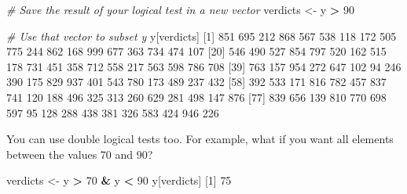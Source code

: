 \documentclass[]{book}
\newenvironment{Shaded}{\begin{snugshade}}{\end{snugshade}}
\newcommand{\CommentTok}[1]{\textcolor[rgb]{0.56,0.35,0.01}{\textit{#1}}}
\newcommand{\DecValTok}[1]{\textcolor[rgb]{0.00,0.00,0.81}{#1}}
\newcommand{\NormalTok}[1]{#1}
\newcommand{\OperatorTok}[1]{\textcolor[rgb]{0.81,0.36,0.00}{\textbf{#1}}}
\newcommand{\StringTok}[1]{\textcolor[rgb]{0.31,0.60,0.02}{#1}}
\begin{document}
\begin{Shaded}
\begin{Highlighting}[]
\CommentTok{# Save the result of your logical test in a new vector}
\NormalTok{verdicts <-}\StringTok{ }\NormalTok{y }\OperatorTok{>}\StringTok{ }\DecValTok{90}

\CommentTok{# Use that vector to subset y}
\NormalTok{y[verdicts]}
\NormalTok{ [}\DecValTok{1}\NormalTok{] }\DecValTok{851} \DecValTok{695} \DecValTok{212} \DecValTok{868} \DecValTok{567} \DecValTok{538} \DecValTok{118} \DecValTok{172} \DecValTok{505} \DecValTok{775} \DecValTok{244} \DecValTok{862} \DecValTok{168} \DecValTok{999} \DecValTok{677} \DecValTok{363} \DecValTok{734} \DecValTok{474} \DecValTok{107}
\NormalTok{[}\DecValTok{20}\NormalTok{] }\DecValTok{546} \DecValTok{490} \DecValTok{527} \DecValTok{854} \DecValTok{797} \DecValTok{520} \DecValTok{162} \DecValTok{515} \DecValTok{178} \DecValTok{731} \DecValTok{451} \DecValTok{358} \DecValTok{712} \DecValTok{558} \DecValTok{217} \DecValTok{563} \DecValTok{598} \DecValTok{786} \DecValTok{708}
\NormalTok{[}\DecValTok{39}\NormalTok{] }\DecValTok{763} \DecValTok{157} \DecValTok{954} \DecValTok{272} \DecValTok{647} \DecValTok{102}  \DecValTok{94} \DecValTok{246} \DecValTok{390} \DecValTok{175} \DecValTok{829} \DecValTok{937} \DecValTok{401} \DecValTok{543} \DecValTok{780} \DecValTok{173} \DecValTok{489} \DecValTok{237} \DecValTok{432}
\NormalTok{[}\DecValTok{58}\NormalTok{] }\DecValTok{392} \DecValTok{533} \DecValTok{171} \DecValTok{816} \DecValTok{782} \DecValTok{457} \DecValTok{837} \DecValTok{741} \DecValTok{120} \DecValTok{188} \DecValTok{496} \DecValTok{325} \DecValTok{313} \DecValTok{260} \DecValTok{629} \DecValTok{281} \DecValTok{498} \DecValTok{147} \DecValTok{876}
\NormalTok{[}\DecValTok{77}\NormalTok{] }\DecValTok{839} \DecValTok{656} \DecValTok{139} \DecValTok{810} \DecValTok{770} \DecValTok{698} \DecValTok{597}  \DecValTok{95} \DecValTok{128} \DecValTok{288} \DecValTok{438} \DecValTok{381} \DecValTok{326} \DecValTok{583} \DecValTok{424} \DecValTok{946} \DecValTok{226}
\end{Highlighting}
\end{Shaded}

You can use double logical tests too. For example, what if you want all elements between the values 70 and 90?

\begin{Shaded}
\begin{Highlighting}[]
\NormalTok{verdicts <-}\StringTok{ }\NormalTok{y }\OperatorTok{>}\StringTok{ }\DecValTok{70} \OperatorTok{&}\StringTok{ }\NormalTok{y }\OperatorTok{<}\StringTok{ }\DecValTok{90}
\NormalTok{y[verdicts]}
\NormalTok{[}\DecValTok{1}\NormalTok{] }\DecValTok{75}
\end{Highlighting}
\end{Shaded}
\end{document}
